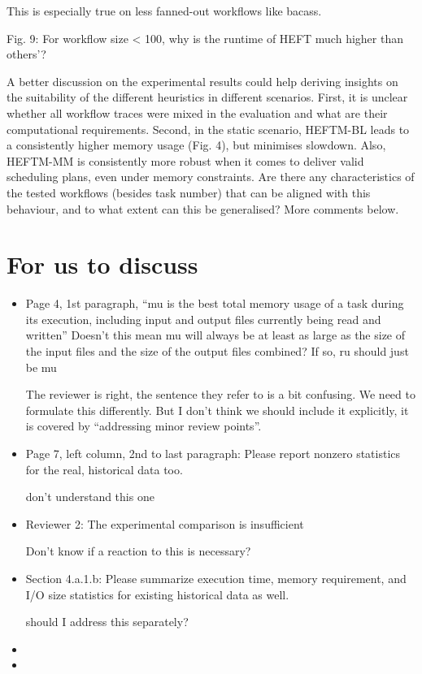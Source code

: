 \documentclass{article}
\begin{document}
    This is especially true on less fanned-out workflows like bacass.

    Fig. 9: For workflow size < 100, why is the runtime of HEFT much higher than others'?

    A better discussion on the experimental results could help deriving
    insights on the suitability of the different heuristics in different
    scenarios. First, it is unclear whether all workflow traces were mixed
    in the evaluation and what are their computational requirements. Second,
    in the static scenario, HEFTM-BL leads to a consistently higher memory
    usage (Fig. 4), but minimises slowdown. Also, HEFTM-MM is consistently
    more robust when it comes to deliver valid scheduling plans, even under
    memory constraints. Are there any characteristics of the tested
    workflows (besides task number) that can be aligned with this behaviour,
    and to what extent can this be generalised? More comments below.




    \section{For us to discuss}

    \begin{itemize}
        \item Page 4, 1st paragraph, ``mu is the best total memory usage of a task during its execution, including input and output files currently being read and written''
        Doesn't this mean mu will always be at least as large as the size of the input files and the size of the output files combined? If so, ru should just be mu

        The reviewer is right, the sentence they refer to is a bit confusing. We need to formulate this differently.
        But I don't think we should include it explicitly, it is covered by ``addressing minor review points''.

        \item  Page 7, left column, 2nd to last paragraph: Please report nonzero statistics for the real, historical data too.

        don't understand this one
        \item Reviewer 2: The experimental comparison is insufficient

        Don't know if a reaction to this is necessary?
        \item  Section 4.a.1.b: Please summarize execution time, memory requirement, and I/O size statistics for existing historical data as well.

        should I address this separately?
        \item
        \item

    \end{itemize}
\end{document}
